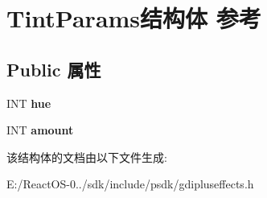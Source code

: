 \hypertarget{struct_tint_params}{}\section{Tint\+Params结构体 参考}
\label{struct_tint_params}
\subsection*{Public 属性}
\begin{DoxyCompactItemize}
\item 
\mbox{\label{struct_tint_params_a2068eff3fdcb0426855e81e7f822671a}} 
I\+NT {\bfseries hue}
\item 
\mbox{\label{struct_tint_params_afd3494c487faa08ac6af1c3c4b8c2a32}} 
I\+NT {\bfseries amount}
\end{DoxyCompactItemize}


该结构体的文档由以下文件生成\+:\begin{DoxyCompactItemize}
\item 
E\+:/\+React\+O\+S-\/0../sdk/include/psdk/gdipluseffects.\+h\end{DoxyCompactItemize}
